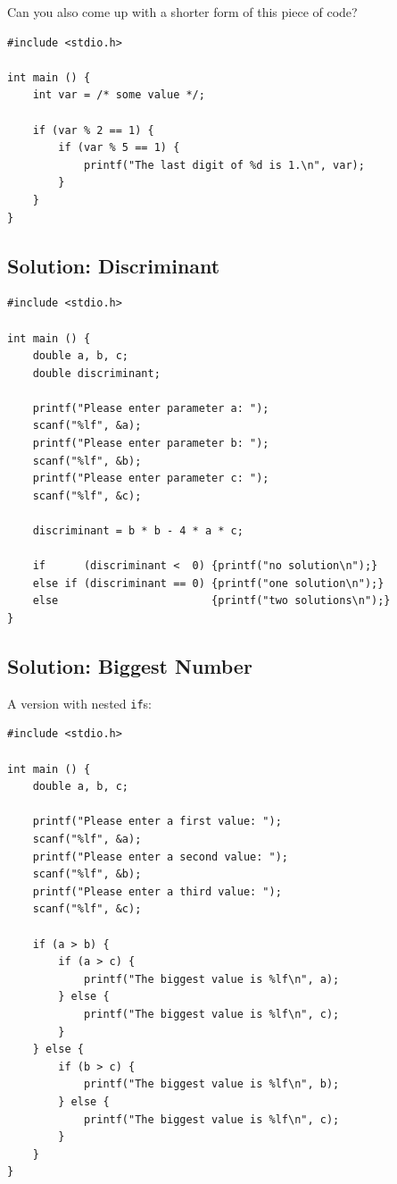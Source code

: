 Can you also come up with a shorter form of this piece of code?
\begin{codebox}
\begin{verbatim}
#include <stdio.h>

int main () {
    int var = /* some value */;

    if (var % 2 == 1) {
        if (var % 5 == 1) {
            printf("The last digit of %d is 1.\n", var);
        }
    }
}
\end{verbatim}
\end{codebox}


\newpage


\subsection*{Solution: Discriminant}
\begin{codebox}[exo5-1.c]
\begin{verbatim}
#include <stdio.h>

int main () {
    double a, b, c;
    double discriminant;
    
    printf("Please enter parameter a: ");
    scanf("%lf", &a);
    printf("Please enter parameter b: ");
    scanf("%lf", &b);
    printf("Please enter parameter c: ");
    scanf("%lf", &c);
    
    discriminant = b * b - 4 * a * c;
    
    if      (discriminant <  0) {printf("no solution\n");}
    else if (discriminant == 0) {printf("one solution\n");}
    else                        {printf("two solutions\n");}
}
\end{verbatim}
\end{codebox}


\subsection*{Solution: Biggest Number}
A version with nested \texttt{if}s:
\begin{codebox}[exo5-2a.c]
\begin{verbatim}
#include <stdio.h>

int main () {
    double a, b, c;
    
    printf("Please enter a first value: ");
    scanf("%lf", &a);
    printf("Please enter a second value: ");
    scanf("%lf", &b);
    printf("Please enter a third value: ");
    scanf("%lf", &c);
    
    if (a > b) {
        if (a > c) {
            printf("The biggest value is %lf\n", a);
        } else {
            printf("The biggest value is %lf\n", c);
        }
    } else {
        if (b > c) {
            printf("The biggest value is %lf\n", b);
        } else {
            printf("The biggest value is %lf\n", c);
        }
    }
}
\end{verbatim}
\end{codebox}

